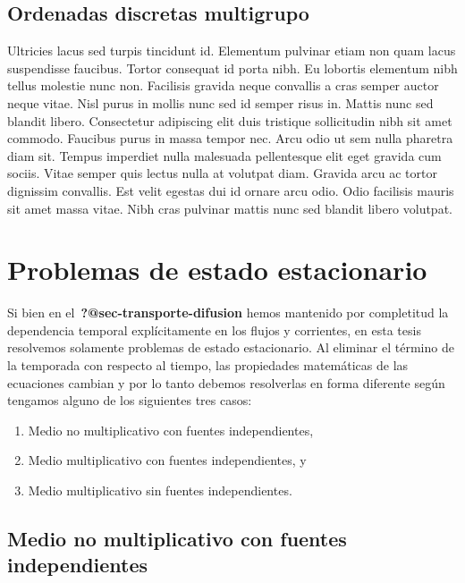\documentclass[
  12pt,
  a4paper,
  table]{scrbook}
\providecommand{\tightlist}{%
  \setlength{\itemsep}{0pt}\setlength{\parskip}{0pt}}\usepackage{longtable,booktabs,array}
\theoremstyle{plain}
\theoremstyle{definition}
\theoremstyle{plain}
\theoremstyle{plain}
\theoremstyle{remark}
\begin{document}
\hypertarget{sec-sn-multigrupo-fem}{%
\subsection{Ordenadas discretas
multigrupo}\label{sec-sn-multigrupo-fem}}

Ultricies lacus sed turpis tincidunt id. Elementum pulvinar etiam non
quam lacus suspendisse faucibus. Tortor consequat id porta nibh. Eu
lobortis elementum nibh tellus molestie nunc non. Facilisis gravida
neque convallis a cras semper auctor neque vitae. Nisl purus in mollis
nunc sed id semper risus in. Mattis nunc sed blandit libero. Consectetur
adipiscing elit duis tristique sollicitudin nibh sit amet commodo.
Faucibus purus in massa tempor nec. Arcu odio ut sem nulla pharetra diam
sit. Tempus imperdiet nulla malesuada pellentesque elit eget gravida cum
sociis. Vitae semper quis lectus nulla at volutpat diam. Gravida arcu ac
tortor dignissim convallis. Est velit egestas dui id ornare arcu odio.
Odio facilisis mauris sit amet massa vitae. Nibh cras pulvinar mattis
nunc sed blandit libero volutpat.

\hypertarget{sec-problemas-steady-state}{%
\section{Problemas de estado
estacionario}\label{sec-problemas-steady-state}}

Si bien en el~\textbf{?@sec-transporte-difusion} hemos mantenido por
completitud la dependencia temporal explícitamente en los flujos y
corrientes, en esta tesis resolvemos solamente problemas de estado
estacionario. Al eliminar el término de la temporada con respecto al
tiempo, las propiedades matemáticas de las ecuaciones cambian y por lo
tanto debemos resolverlas en forma diferente según tengamos alguno de
los siguientes tres casos:

\begin{enumerate}
\tightlist
\item
  Medio no multiplicativo con fuentes independientes,
\item
  Medio multiplicativo con fuentes independientes, y
\item
  Medio multiplicativo sin fuentes independientes.
\end{enumerate}

\hypertarget{sec-nomult-src}{%
\subsection{Medio no multiplicativo con fuentes
independientes}\label{sec-nomult-src}}
\end{document}
